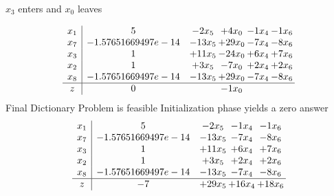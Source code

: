 \documentclass[12pt]{article}
\begin{document}
 $ x_{3} $ enters and $ x_{0} $ leaves 

 \[\begin{array}{c| c c@{\hskip 2pt} c@{\hskip 2pt} c@{\hskip 2pt} c@{\hskip 2pt} }
 x_{1}   &  5 & -2 x_{5} & + 4 x_{0} & -1 x_{4} & -1 x_{6}\\
 x_{7}   &  -1.57651669497e-14 & -13 x_{5} & + 29 x_{0} & -7 x_{4} & -8 x_{6}\\
 x_{3}   &  1 & + 11 x_{5} & -24 x_{0} & + 6 x_{4} & + 7 x_{6}\\
 x_{2}   &  1 & + 3 x_{5} & -7 x_{0} & + 2 x_{4} & + 2 x_{6}\\
 x_{8}   &  -1.57651669497e-14 & -13 x_{5} & + 29 x_{0} & -7 x_{4} & -8 x_{6}\\
\hline
z    &  0  &   & -1 x_{0} &    &   \\
\end{array}\]
Final Dictionary
Problem is feasible Initialization phase yields a zero answer 
\[\begin{array}{c| c c@{\hskip 2pt} c@{\hskip 2pt} c@{\hskip 2pt} }
 x_{1}   &  5 & -2 x_{5} & -1 x_{4} & -1 x_{6}\\
 x_{7}   &  -1.57651669497e-14 & -13 x_{5} & -7 x_{4} & -8 x_{6}\\
 x_{3}   &  1 & + 11 x_{5} & + 6 x_{4} & + 7 x_{6}\\
 x_{2}   &  1 & + 3 x_{5} & + 2 x_{4} & + 2 x_{6}\\
 x_{8}   &  -1.57651669497e-14 & -13 x_{5} & -7 x_{4} & -8 x_{6}\\
\hline
z    &  -7 & + 29 x_{5} & + 16 x_{4} & + 18 x_{6}\\
\end{array}\]
\end{document}
